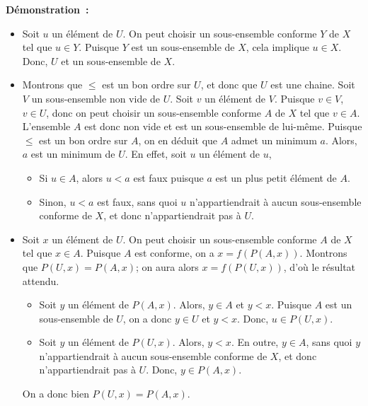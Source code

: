 \noindent\textbf{Démonstration :} 
    \begin{itemize}
        \item Soit $u$ un élément de $U$. 
            On peut choisir un sous-ensemble conforme $Y$ de $X$ tel que $u \in Y$. 
            Puisque $Y$ est un sous-ensemble de $X$, cela implique $u \in X$.
            Donc, $U$ et un sous-ensemble de $X$. 
        \item Montrons que $\leq$ est un bon ordre sur $U$, et donc que $U$ est une chaine.
            Soit $V$ un sous-ensemble non vide de $U$. 
            Soit $v$ un élément de $V$. 
            Puisque $v \in V$, $v \in U$, donc on peut choisir un sous-ensemble conforme $A$ de $X$ tel que $v \in A$.
            L'ensemble $A$ est donc non vide et est un sous-ensemble de lui-même.
            Puisque $\leq$ est un bon ordre sur $A$, on en déduit que $A$ admet un minimum $a$.
            Alors, $a$ est un minimum de $U$.
            En effet, soit $u$ un élément de $u$, 
            \begin{itemize}[nosep]
                \item Si $u \in A$, alors $u < a$ est faux puisque $a$ est un plus petit élément de $A$.
                \item Sinon, $u < a$ est faux, sans quoi $u$ n'appartiendrait à aucun sous-ensemble conforme de $X$, et donc n'appartiendrait pas à $U$.
            \end{itemize}
        \item Soit $x$ un élément de $U$.
            On peut choisir un sous-ensemble conforme $A$ de $X$ tel que $x \in A$. 
            Puisque $A$ est conforme, on a $x = f(P(A,x))$.
            Montrons que $P(U, x) = P(A, x)$; on aura alors $x = f(P(U,x))$, d'où le résultat attendu.
            \begin{itemize}[nosep]
                \item Soit $y$ un élément de $P(A, x)$.
                    Alors, $y \in A$ et $y < x$.
                    Puisque $A$ est un sous-ensemble de $U$, on a donc $y \in U$ et $y < x$.
                    Donc, $u \in P(U, x)$.
                \item Soit $y$ un élément de $P(U, x)$.
                    Alors, $y < x$.
                    En outre, $y \in A$, sans quoi $y$ n'appartiendrait à aucun sous-ensemble conforme de $X$, et donc n'appartiendrait pas à $U$. 
                    Donc, $y \in P(A, x)$.
            \end{itemize}
            On a donc bien $P(U,x) = P(A,x)$.
    \end{itemize}

